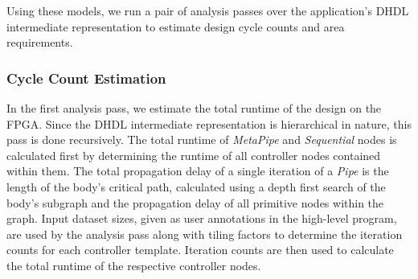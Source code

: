 Using these models, we run a pair of analysis passes over the application's DHDL intermediate representation to estimate design cycle counts and area requirements.


\subsubsection{Cycle Count Estimation}
In the first analysis pass, we estimate the total runtime of the design on the FPGA.
Since the DHDL intermediate representation is hierarchical in nature, this pass is done recursively.
The total runtime of \emph{MetaPipe} and \emph{Sequential} nodes is calculated first by determining
the runtime of all controller nodes contained within them. The total propagation delay of a single
iteration of a \emph{Pipe} is the length of the body's critical path, calculated using a depth first
search of the body's subgraph and the propagation delay of all primitive nodes within the graph.
Input dataset sizes, given as user annotations in the high-level program, are used by the analysis pass
along with tiling factors to determine the iteration counts for each controller template.
Iteration counts are then used to calculate the total runtime of the respective controller nodes. %


